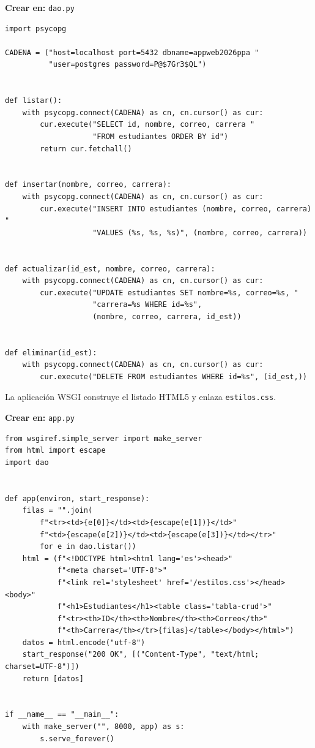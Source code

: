 {\small\textbf{Crear en:} \texttt{dao.py}}
\begin{lstlisting}[style=python,caption={dao.py --- CRUD con psycopg},label={lst:c6-py-dao}]
import psycopg

CADENA = ("host=localhost port=5432 dbname=appweb2026ppa "
          "user=postgres password=P@$7Gr3$QL")


def listar():
    with psycopg.connect(CADENA) as cn, cn.cursor() as cur:
        cur.execute("SELECT id, nombre, correo, carrera "
                    "FROM estudiantes ORDER BY id")
        return cur.fetchall()


def insertar(nombre, correo, carrera):
    with psycopg.connect(CADENA) as cn, cn.cursor() as cur:
        cur.execute("INSERT INTO estudiantes (nombre, correo, carrera) "
                    "VALUES (%s, %s, %s)", (nombre, correo, carrera))


def actualizar(id_est, nombre, correo, carrera):
    with psycopg.connect(CADENA) as cn, cn.cursor() as cur:
        cur.execute("UPDATE estudiantes SET nombre=%s, correo=%s, "
                    "carrera=%s WHERE id=%s",
                    (nombre, correo, carrera, id_est))


def eliminar(id_est):
    with psycopg.connect(CADENA) as cn, cn.cursor() as cur:
        cur.execute("DELETE FROM estudiantes WHERE id=%s", (id_est,))
\end{lstlisting}

La aplicación WSGI construye el listado HTML5 y enlaza
\texttt{estilos.css}.

{\small\textbf{Crear en:} \texttt{app.py}}
\begin{lstlisting}[style=python,caption={app.py --- vista de listado (WSGI)},label={lst:c6-py-app}]
from wsgiref.simple_server import make_server
from html import escape
import dao


def app(environ, start_response):
    filas = "".join(
        f"<tr><td>{e[0]}</td><td>{escape(e[1])}</td>"
        f"<td>{escape(e[2])}</td><td>{escape(e[3])}</td></tr>"
        for e in dao.listar())
    html = (f"<!DOCTYPE html><html lang='es'><head>"
            f"<meta charset='UTF-8'>"
            f"<link rel='stylesheet' href='/estilos.css'></head><body>"
            f"<h1>Estudiantes</h1><table class='tabla-crud'>"
            f"<tr><th>ID</th><th>Nombre</th><th>Correo</th>"
            f"<th>Carrera</th></tr>{filas}</table></body></html>")
    datos = html.encode("utf-8")
    start_response("200 OK", [("Content-Type", "text/html; charset=UTF-8")])
    return [datos]


if __name__ == "__main__":
    with make_server("", 8000, app) as s:
        s.serve_forever()
\end{lstlisting}

